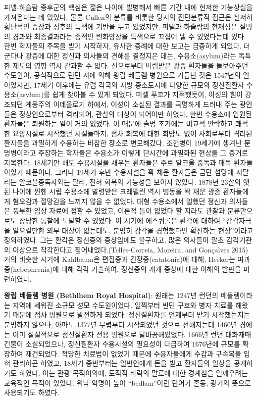 \documentclass[
]{article}
\begin{document}
피넬-하슬람 증후군의 핵심은 젊은 나이에 발병해서 빠른 기간 내에 현저한
기능상실을 가져온다는 데 있었다. 물론 Cullen의 분류를 비롯한 당시의
진단분류적 접근은 철저히 횡단적인 증상과 징후의 특색에 기반을 두고
있었지만, 피넬과 하슬람의 천재성은 질병의 경과와 최종결과라는 종적인
변화양상을 특색으로 끄집어 낼 수 있었다는데 있다. 한번 학자들의 주목을
받기 시작하자, 유사한 증례에 대한 보고는 급증하게 되었다. 더군다나
광증에 대한 정신과 의사들의 견해를 결정지은 데는, 수용소(asylum)라는
독특한 제도의 영향 역시 간과할 수 없다. 신으로부터 버림받은 광증
환자들을 돌보아주던 수도원이, 공식적으로 런던 시에 의해 왕립 베들렘
병원으로 거듭난 것은 1547년의 일이었지만, 17세기 이후에는 유럽 각국의
지방 중소도시에 다양한 규모의 정신질환자 수용소(asylum)를 쉽게 찾아볼 수
있게 되었다. 미셀 푸코가 지적했듯이, 이성의 힘이 강조되던 계몽주의
이데올로기 하에서, 이성이 소실된 결과를 극명하게 드러내 주는 광인들은
정상인으로부터 격리되어, 관찰의 대상이 되어야만 하였다. 한번 수용소에
입원된 환자들은 퇴원하는 일이 거의 없었다. 이 때문에 출범 초기에는
비교적 안락하고 쾌적한 요양시설로 시작했던 시설들마저, 점차 회복에 대한
희망도 없이 사회로부터 격리된 환자들을 과밀하게 수용하는 비참한 장소로
변모해갔다. 조현병이 19세기에 생겨난 문명병이라고 주장하는 학자들은
수용소가 이렇게 단시간에 과밀화된 현상을 그 증거로 지목한다. 18세기만
해도 수용시설을 채우는 환자들은 주로 알코올 중독과 매독 환자들이었기
때문이다. 그러나 19세기 후반 수용시설을 꽉 채운 환자들은 금단 섬망에
시달리는 알코올중독자와는 달리, 전혀 회복의 가능성을 보이지 않았다.
1878년 23살의 앳된 나이에 뮌헨 시립 수용소에 발령받은 크레펠린 역시
병동을 꽉 채운 광증 환자들에게 혐오감과 절망감을 느끼지 않을 수 없었다.
대형 수용소에서 일했던 정신과 의사들은 풍부한 임상 자료에 접할 수
있었고, 이론적 틀이 없었다 할 지라도 관찰과 분류만으로도 상당한 통찰에
도달할 수 있었다. 이 시기에 에스퀴롤은 환각에 대하여 ``감각자극을
일으킬만한 외부 대상이 없는데도, 분명히 감각을 경험했다면 확신하는
현상''이라고 정의하였다. 그는 환각은 정신증의 증상임에도 불구하고, 많은
의사들이 말초 감각기관의 이상으로 착각한다고 짚어내었다.(Telles-Correia,
Moreira, and Gonçalves 2015) 거의 비슷한 시기에 Kahlbaum은 편집증과
긴장증(catatonia)에 대해, Hecker는 파과증(hebephrenia)에 대해 각각
기술하여, 정신증의 개개 증상에 대한 이해의 발판을 마련하였다.

\textbf{왕립 베들렘 병원 (Bethlhem Royal Hospital)}: 원래는 1247년
런던의 베들렘이라는 지역에 세워진 소규모 성모 수도원이었다. 일찍부터
빈민 구호와 병자 치료를 해왔기 때문에 점차 병원으로 발전하게 되었다.
정신질환자를 언제부터 받기 시작했는지는 분명하지 않으나, 아마도 1377년
무렵부터 시작되었던 것으로 전해지는데 1460년 경에는 이미 실질적으로
정신질환자 전용 병원으로 탈바꿈해있었다. 1666년 런던 대화재때 건물이
소실되었으나, 정신질환자 수용시설의 필요성이 다급하여 1676년에 규모를
확장하여 재건되었다. 적당한 치료법이 없었기 때문에 수용자들에게 수갑과
구속복을 입혀 관리하곤 하였고, 18세기 중반부터는 일반인에게 돈을 받고
환자들의 일상을 공개하기도 하였다. 이는 관광 목적이외에, 도적적 타락의
말로에 대한 경계심을 일깨우려는 교육적인 목적이 있었다. 워낙 악명이 높아
``bedlam''이란 단어가 혼동, 광기의 뜻으로 사용되기도 하였다.
\end{document}
